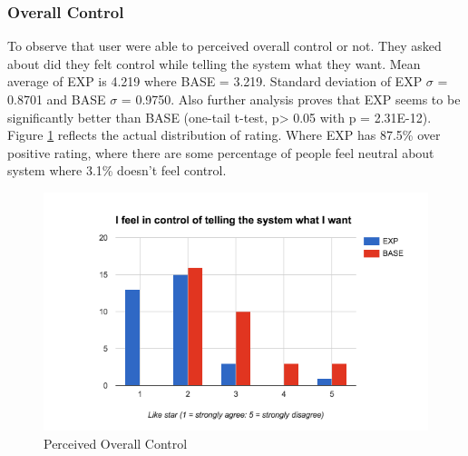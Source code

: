 \subsubsection{Overall Control}
To observe that user were able to perceived overall control or not. They asked about did they felt control while telling the system what they want.  Mean average of EXP is 4.219 where BASE = 3.219. Standard deviation of EXP ${\sigma}$ = 0.8701 and BASE ${\sigma}$ = 0.9750. Also further analysis proves that EXP seems to be significantly better than BASE (one-tail t-test, p> 0.05 with p = 2.31E-12). Figure \ref{fig:ch5_stat_overall_control} reflects the actual distribution of rating. Where EXP has 87.5\% over positive rating, where there are some percentage of people feel neutral about system where 3.1\% doesn’t feel control.
\begin{figure}[h]
	\centering
	\includegraphics[width= 1\linewidth]{figures/ch5_stat_overall_control}
	\caption{Perceived Overall Control}
	\label{fig:ch5_stat_overall_control}
\end{figure}
